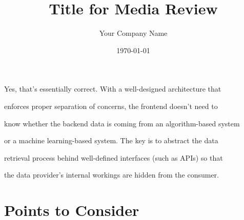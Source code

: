 \documentclass[11pt]{article}
\title{Title for Media Review}
\author{Your Company Name}
\date{\today}
\begin{document}
\maketitle
\tableofcontents
\newpage

Yes, that's essentially correct. With a well-designed architecture that

enforces proper separation of concerns, the frontend doesn't need to

know whether the backend data is coming from an algorithm-based system

or a machine learning-based system. The key is to abstract the data

retrieval process behind well-defined interfaces (such as APIs) so that

the data provider's internal workings are hidden from the consumer.



\section{Points to Consider}\label{points-to-consider}
\end{document}
